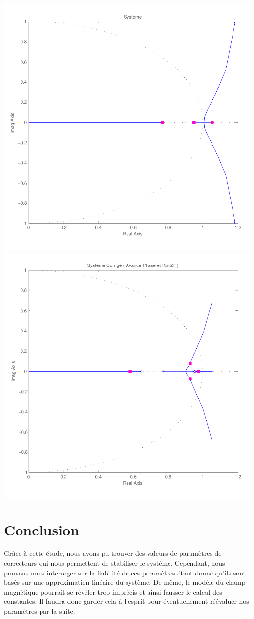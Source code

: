 \documentclass[11pt, french]{article} %
\begin{document}
\includegraphics[scale=0.50]{RLN_Sys_Seul.pdf}
\includegraphics[scale=0.50]{RLN_Sys_AvPh_K27.pdf}

\section{Conclusion}

Grâce à cette étude, nous avons pu trouver des valeurs de paramètres de correcteurs qui nous permettent de stabiliser le système. Cependant, nous pouvons nous interroger sur la fiabilité de ces paramètres étant donné qu'ils sont basés sur une approximation linéaire du système. De même, le modèle du champ magnétique pourrait se révéler trop imprécis et ainsi fausser le calcul des constantes. Il faudra donc garder cela à l'esprit pour éventuellement réévaluer nos paramètres par la suite. 
\end{document}
